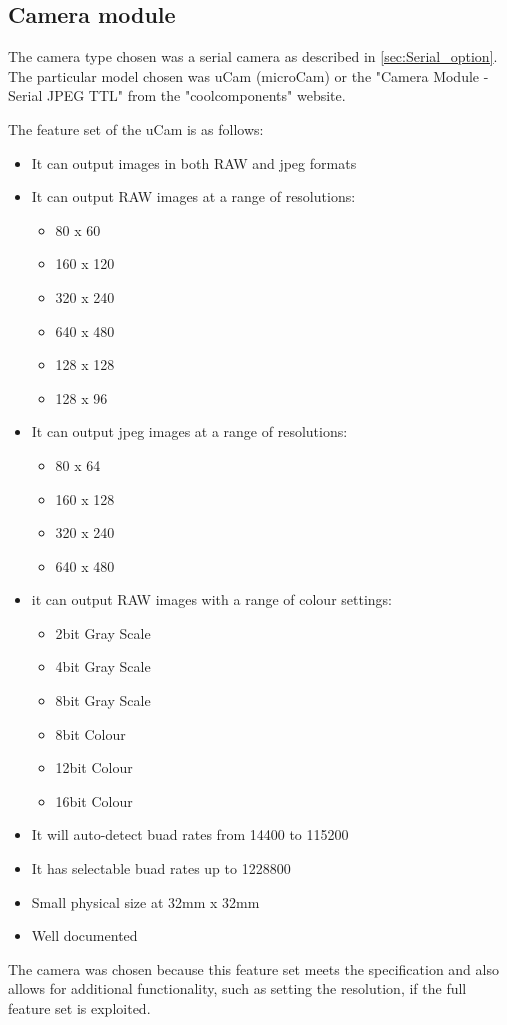 \subsection{Camera module}
\label{sec:John_chosen_options}

The camera type chosen was a serial camera as described in \ref{sec:Serial_option}. The particular model chosen was uCam (microCam) or the "Camera Module - Serial JPEG TTL" from the "coolcomponents" website.

The feature set of the uCam is as follows:
	\begin{itemize}
		\item It can output images in both RAW and jpeg formats
		\item It can output RAW images at a range of resolutions:
		\begin{itemize}
			\item 80 x 60
			\item 160 x 120
			\item 320 x 240
			\item 640 x 480
			\item 128 x 128
			\item 128 x 96
		\end{itemize}
		\item It can output jpeg images at a range of resolutions:
		\begin{itemize}
			\item 80 x 64
			\item 160 x 128
			\item 320 x 240
			\item 640 x 480
		\end{itemize}
		\item it can output RAW images with a range of colour settings:
		\begin{itemize}
			\item 2bit Gray Scale
			\item 4bit Gray Scale
			\item 8bit Gray Scale
			\item 8bit Colour
			\item 12bit Colour
			\item 16bit Colour
		\end{itemize}
		\item It will auto-detect buad rates from 14400 to 115200
		\item It has selectable buad rates up to 1228800
		\item Small physical size at 32mm x 32mm
		\item Well documented
	\end{itemize}

The camera was chosen because this feature set meets the specification and also allows for additional functionality, such as setting the resolution, if the full feature set is exploited.